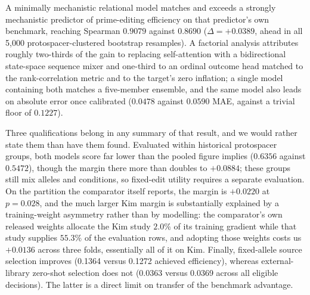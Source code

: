 \documentclass[11pt]{article}
\begin{document}
A minimally mechanistic relational model matches and exceeds a strongly mechanistic
predictor of prime-editing efficiency on that predictor's own benchmark, reaching
Spearman $0.9079$ against $0.8690$ ($\Delta=+0.0389$, ahead in all 5{,}000
protospacer-clustered bootstrap resamples). A factorial analysis attributes roughly
two-thirds of the gain to replacing self-attention with a bidirectional state-space
sequence mixer and one-third to an ordinal outcome head matched to the rank-correlation
metric and to the target's zero inflation; a single model containing both matches a
five-member ensemble, and the same model also leads on absolute error once calibrated
($0.0478$ against $0.0590$ MAE, against a trivial floor of $0.1227$).

Three qualifications belong in any summary of that result, and we would rather state
them than have them found. Evaluated within historical protospacer groups, both
models score far lower than the pooled figure implies
($0.6356$ against $0.5472$), though the margin there more than doubles to $+0.0884$;
these groups still mix alleles and conditions, so fixed-edit utility requires a
separate evaluation. On the
partition the comparator itself reports, the margin is $+0.0220$ at $p=0.028$, and the
much larger Kim margin is substantially explained by a training-weight asymmetry rather
than by modelling: the comparator's own released weights allocate the Kim study $2.0\%$
of its training gradient while that study supplies $55.3\%$ of the evaluation rows, and
adopting those weights costs us $+0.0136$ across three folds, essentially all of it on
Kim. Finally, fixed-allele source selection improves (0.1364 versus 0.1272 achieved
efficiency), whereas external-library zero-shot selection does not (0.0363 versus
0.0369 across all eligible decisions). The latter is a direct limit on transfer
of the benchmark advantage.
\end{document}
